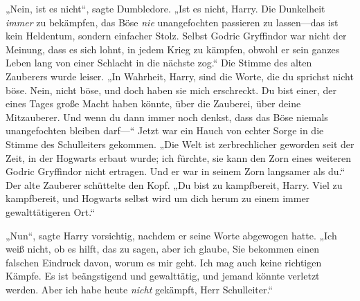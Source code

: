 „Nein, ist es nicht“, sagte Dumbledore. „Ist es nicht, Harry. Die Dunkelheit \emph{immer} zu bekämpfen, das Böse \emph{nie} unangefochten passieren zu lassen—das ist kein Heldentum, sondern einfacher Stolz. Selbst Godric Gryffindor war nicht der Meinung, dass es sich lohnt, in jedem Krieg zu kämpfen, obwohl er sein ganzes Leben lang von einer Schlacht in die nächste zog.“ Die Stimme des alten Zauberers wurde leiser. „In Wahrheit, Harry, sind die Worte, die du sprichst nicht böse. Nein, nicht böse, und doch haben sie mich erschreckt. Du bist einer, der eines Tages große Macht haben könnte, über die Zauberei, über deine Mitzauberer. Und wenn du dann immer noch denkst, dass das Böse niemals unangefochten bleiben darf—“ Jetzt war ein Hauch von echter Sorge in die Stimme des Schulleiters gekommen. „Die Welt ist zerbrechlicher geworden seit der Zeit, in der Hogwarts erbaut wurde; ich fürchte, sie kann den Zorn eines weiteren Godric Gryffindor nicht ertragen. Und er war in seinem Zorn langsamer als du.“ Der alte Zauberer schüttelte den Kopf. „Du bist zu kampfbereit, Harry. Viel zu kampfbereit, und Hogwarts selbst wird um dich herum zu einem immer gewalttätigeren Ort.“

„Nun“, sagte Harry vorsichtig, nachdem er seine Worte abgewogen hatte. „Ich weiß nicht, ob es hilft, das zu sagen, aber ich glaube, Sie bekommen einen falschen Eindruck davon, worum es mir geht. Ich mag auch keine richtigen Kämpfe. Es ist beängstigend und gewalttätig, und jemand könnte verletzt werden. Aber ich habe heute \emph{nicht} gekämpft, Herr Schulleiter.“

